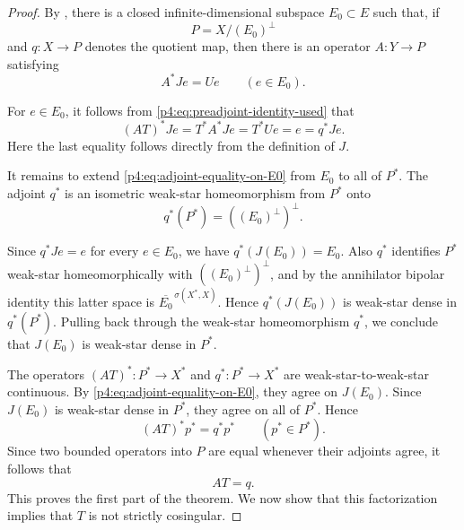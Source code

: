 \documentclass[11pt,reqno]{amsart}
\makeatletter
\theoremstyle{plain}
\theoremstyle{definition}
\newcounter{problempaper}
\newenvironment{problempaperbody}{%
  \setcounter{subsection}{0}%
  \setcounter{subsubsection}{0}%
  \setcounter{paragraph}{0}%
  \renewcommand{\thesubsection}{\arabic{subsection}}%
  \renewcommand{\thesubsubsection}{\thesubsection.\arabic{subsubsection}}%
  \renewcommand{\theparagraph}{\thesubsubsection.\arabic{paragraph}}%
  \let\problem@outersection\section
  \let\problem@outersubsection\subsection
  \let\problem@outersubsubsection\subsubsection
  \let\problem@outerparagraph\paragraph
  \let\section\problem@papersection
  \let\subsection\problem@papersubsection
  \let\subsubsection\problem@papersubsubsection
}{%
  \let\section\problem@outersection
  \let\subsection\problem@outersubsection
  \let\subsubsection\problem@outersubsubsection
  \let\paragraph\problem@outerparagraph
}
\newcommand{\problem@target}[2]{%
  \hypertarget{problem-\theproblempaper-#1-#2}{}%
}
\newcommand{\problem@paperheading}[3]{%
  \par\bigskip
  \problem@target{#1}{#2}%
  \noindent{\large\bfseries #2.\quad #3\par}%
  \nobreak\smallskip
}
\newcommand{\problem@papersubheading}[3]{%
  \par\medskip
  \problem@target{#1}{#2}%
  \noindent{\normalsize\bfseries #2.\quad #3\par}%
  \nobreak\smallskip
}
\newcommand{\problem@papersubsubheading}[3]{%
  \par\smallskip
  \problem@target{#1}{#2}%
  \noindent{\normalsize\itshape #2.\quad #3.\ }%
}
\def\problem@papersection{%
  \@ifstar{\problem@papersectionstar}{\problem@papersectionnostar}%
}
\def\problem@papersectionstar#1{%
  \par\bigskip\noindent{\large\bfseries #1\par}\nobreak\smallskip
}
\def\problem@papersectionnostar#1{%
  \refstepcounter{subsection}%
  \setcounter{subsubsection}{0}%
  \setcounter{paragraph}{0}%
  \problem@paperheading{section}{\thesubsection}{#1}%
  \problem@writecontentsline{section}{\thesubsection}{#1}%
}
\def\problem@papersubsection{%
  \@ifstar{\problem@papersubsectionstar}{\problem@papersubsectionnostar}%
}
\def\problem@papersubsectionstar#1{%
  \par\medskip\noindent{\normalsize\bfseries #1\par}\nobreak\smallskip
}
\def\problem@papersubsectionnostar#1{%
  \refstepcounter{subsubsection}%
  \setcounter{paragraph}{0}%
  \problem@papersubheading{subsection}{\thesubsubsection}{#1}%
  \problem@writecontentsline{subsection}{\thesubsubsection}{#1}%
}
\def\problem@papersubsubsection{%
  \@ifstar{\problem@papersubsubsectionstar}{\problem@papersubsubsectionnostar}%
}
\def\problem@papersubsubsectionstar#1{%
  \par\smallskip\noindent{\normalsize\itshape #1.\ }%
}
\def\problem@papersubsubsectionnostar#1{%
  \refstepcounter{paragraph}%
  \problem@papersubsubheading{subsubsection}{\theparagraph}{#1}%
  \problem@writecontentsline{subsubsection}{\theparagraph}{#1}%
}
\newcommand{\problem@writecontentsline}[3]{%
  \begingroup
  \protected@write\@auxout{}{%
    \string\problemcontentsentry{\theproblempaper}{#1}{#2}{#3}{\thepage}%
  }%
  \endgroup
}
\newcommand{\problemcontentsentry}[5]{%
  \@ifundefined{problemcontents@#1}{%
    \expandafter\gdef\csname problemcontents@#1\endcsname{}%
  }{}%
  \expandafter\g@addto@macro\csname problemcontents@#1\endcsname{%
    \problemcontentsline{#1}{#2}{#3}{#4}{#5}%
  }%
}
\newcommand{\problemcontentslink}[4]{%
  \hyperlink{problem-#1-#2-#3}{#4}%
}
\newcommand{\problemcontentsline}[5]{%
  \ifstrequal{#2}{section}{%
    \par\noindent
    \problemcontentslink{#1}{#2}{#3}{\makebox[2.5em][l]{#3}#4}%
    \nobreak\dotfill
    \problemcontentslink{#1}{#2}{#3}{#5}\par
  }{%
    \ifstrequal{#2}{subsection}{%
      \par\noindent\hspace*{1.5em}%
      \problemcontentslink{#1}{#2}{#3}{\makebox[3.5em][l]{#3}#4}%
      \nobreak\dotfill
      \problemcontentslink{#1}{#2}{#3}{#5}\par
    }{%
      \par\noindent\hspace*{3em}%
      \problemcontentslink{#1}{#2}{#3}{\makebox[4.5em][l]{#3}#4}%
      \nobreak\dotfill
      \problemcontentslink{#1}{#2}{#3}{#5}\par
    }%
  }%
}
\makeatother
\begin{document}
\begin{problempaperbody}
\begin{proof}
By , there is a closed infinite-dimensional subspace $E_0\subset E$ such that, if
\begin{equation*}
        P=X/(E_0)^\perp
\end{equation*}
and $q\colon X\to P$ denotes the quotient map, then there is an operator $A\colon Y\to P$ satisfying
\begin{equation}
\label{p4:eq:preadjoint-identity-used}
        A^*Je=Ue \qquad(e\in E_0).
\end{equation}

For $e\in E_0$, it follows from \eqref{p4:eq:preadjoint-identity-used} that
\begin{equation}
\label{p4:eq:adjoint-equality-on-E0}
        (AT)^*Je=T^*A^*Je=T^*Ue=e=q^*Je.
\end{equation}
Here the last equality follows directly from the definition of $J$.

It remains to extend \eqref{p4:eq:adjoint-equality-on-E0} from $E_0$ to all of $P^*$. The adjoint $q^*$ is an isometric weak-star homeomorphism from $P^*$ onto
\begin{equation*}
        q^*(P^*)=((E_0)^\perp)^\perp.
\end{equation*}

Since $q^*Je=e$ for every $e\in E_0$, we have $q^*(J(E_0))=E_0$. Also $q^*$ identifies $P^*$ weak-star homeomorphically with $((E_0)^\perp)^\perp$, and by the annihilator bipolar identity this latter space is $\overline{E_0}^{\,\sigma(X^*,X)}$. Hence $q^*(J(E_0))$ is weak-star dense in $q^*(P^*)$. Pulling back through the weak-star homeomorphism $q^*$, we conclude that $J(E_0)$ is weak-star dense in $P^*$.


The operators $(AT)^*\colon P^*\to X^*$ and $q^*\colon P^*\to X^*$ are weak-star-to-weak-star continuous. By \eqref{p4:eq:adjoint-equality-on-E0}, they agree on $J(E_0)$. Since $J(E_0)$ is weak-star dense in $P^*$, they agree on all of $P^*$. Hence
\begin{equation*}
        (AT)^*p^*=q^*p^* \qquad(p^*\in P^*).
\end{equation*}
Since two bounded operators into $P$ are equal whenever their adjoints agree, it follows that
\begin{equation*}
        AT=q.
\end{equation*}
This proves the first part of the theorem. We now show that this factorization implies that $T$ is not strictly cosingular.


\end{proof}
\end{problempaperbody}
\end{document}
